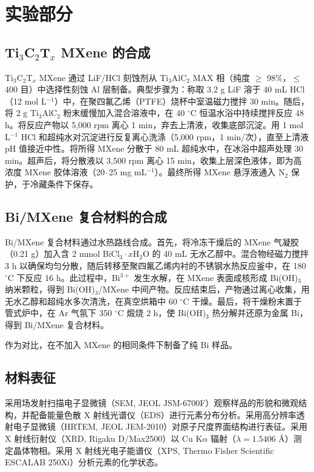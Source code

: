 \section{实验部分}

\subsection{Ti${_3}$C${_2}$T${_x}$ MXene 的合成}

Ti$_{3}$C$_{2}$T$_{x}$ MXene 通过 LiF/HCl 刻蚀剂从 Ti$_{3}$AlC$_{2}$ MAX 相（纯度 $\geq$ 98\%，$\leq$ 400 目）中选择性刻蚀 Al 层制备。典型步骤为：称取 3.2 g LiF 溶于 40 mL HCl（12 mol L$^{-1}$）中，在聚四氟乙烯（PTFE）烧杯中室温磁力搅拌 30 min。随后，将 2 g Ti$_{3}$AlC$_{2}$ 粉末缓慢加入混合溶液中，在 40 $^{\circ}$C 恒温水浴中持续搅拌反应 48 h。将反应产物以 5,000 rpm 离心 1 min，弃去上清液，收集底部沉淀。用 1 mol L$^{-1}$ HCl 和超纯水对沉淀进行反复离心洗涤（5,000 rpm，1 min/次），直至上清液 pH 值接近中性。将所得 MXene 分散于 80 mL 超纯水中，在冰浴中超声处理 30 min。超声后，将分散液以 3,500 rpm 离心 15 min，收集上层深色液体，即为高浓度 MXene 胶体溶液（20--25 mg mL$^{-1}$）。最终所得 MXene 悬浮液通入 N$_{2}$ 保护，于冷藏条件下保存。

\subsection{Bi/MXene 复合材料的合成}

Bi/MXene 复合材料通过水热路线合成。首先，将冷冻干燥后的 MXene 气凝胶（0.21 g）加入含 2 mmol BiCl$_{3}\cdot x$H$_{2}$O 的 40 mL 无水乙醇中。混合物经磁力搅拌 3 h 以确保均匀分散，随后转移至聚四氟乙烯内衬的不锈钢水热反应釜中，在 180 $^{\circ}$C 下反应 16 h。此过程中，Bi$^{3+}$ 发生水解，在 MXene 表面成核形成 Bi(OH)$_{3}$ 纳米颗粒，得到 Bi(OH)$_{3}$/MXene 中间产物。反应结束后，产物通过离心收集，用无水乙醇和超纯水多次清洗，在真空烘箱中 60 $^{\circ}$C 干燥。最后，将干燥粉末置于管式炉中，在 Ar 气氛下 350 $^{\circ}$C 煅烧 2 h，使 Bi(OH)$_{3}$ 热分解并还原为金属 Bi，得到 Bi/MXene 复合材料。

作为对比，在不加入 MXene 的相同条件下制备了纯 Bi 样品。

\subsection{材料表征}

采用场发射扫描电子显微镜（SEM, JEOL JSM-6700F）观察样品的形貌和微观结构，并配备能量色散 X 射线光谱仪（EDS）进行元素分布分析。采用高分辨率透射电子显微镜（HRTEM, JEOL JEM-2010）对原子尺度界面结构进行表征。采用 X 射线衍射仪（XRD, Rigaku D/Max2500）以 Cu K$\alpha$ 辐射（$\lambda = 1.5406$ \AA）测定晶体物相。采用 X 射线光电子能谱仪（XPS, Thermo Fisher Scientific ESCALAB 250Xi）分析元素的化学状态。

